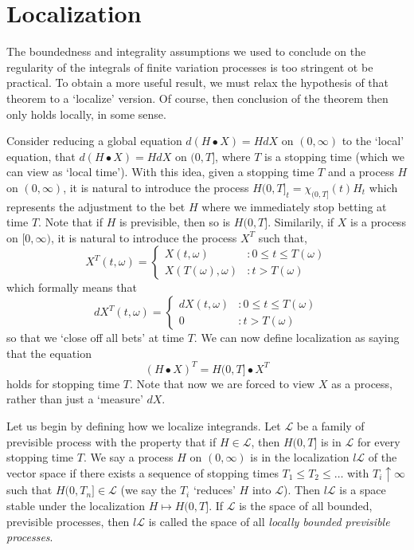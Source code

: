\section{Localization}

The boundedness and integrality assumptions we used to conclude on the regularity of the integrals of finite variation processes is too stringent ot be practical. To obtain a more useful result, we must relax the hypothesis of that theorem to a `localize' version. Of course, then conclusion of the theorem then only holds locally, in some sense.

Consider reducing a global equation $d(H \bullet X) = HdX$ on $(0,\infty)$ to the `local' equation, that $d(H \bullet X) = HdX$ on $(0,T]$, where $T$ is a stopping time (which we can view as `local time'). With this idea, given a stopping time $T$ and a process $H$ on $(0,\infty)$, it is natural to introduce the process $H(0,T]_t = \chi_{(0,T]}(t) H_t$ which represents the adjustment to the bet $H$ where we immediately stop betting at time $T$. Note that if $H$ is previsible, then so is $H(0,T]$. Similarily, if $X$ is a process on $[0,\infty)$, it is natural to introduce the process $X^T$ such that,
%
\[ X^T(t,\omega) = \begin{cases} X(t,\omega) & : 0 \leq t \leq T(\omega) \\ X(T(\omega), \omega) & : t > T(\omega) \end{cases} \]
%
which formally means that
%
\[ dX^T(t,\omega) = \begin{cases} dX(t,\omega) & : 0 \leq t \leq T(\omega) \\ 0 & : t > T(\omega) \end{cases} \]
%
so that we `close off all bets' at time $T$. We can now define localization as saying that the equation
%
\[ (H \bullet X)^T = H(0,T] \bullet X^T \]
%
holds for stopping time $T$. Note that now we are forced to view $X$ as a process, rather than just a `measure' $dX$.

Let us begin by defining how we localize integrands. Let $\mathcal{L}$ be a family of previsible process with the property that if $H \in \mathcal{L}$, then $H(0,T]$ is in $\mathcal{L}$ for every stopping time $T$. We say a process $H$ on $(0,\infty)$ is in the localization $l\mathcal{L}$ of the vector space if there exists a sequence of stopping times $T_1 \leq T_2 \leq \dots$ with $T_i \uparrow \infty$ such that $H(0,T_n] \in \mathcal{L}$ (we say the $T_i$ `reduces' $H$ into $\mathcal{L}$). Then $l\mathcal{L}$ is a space stable under the localization $H \mapsto H(0,T]$. If $\mathcal{L}$ is the space of all bounded, previsible processes, then $l\mathcal{L}$ is called the space of all {\it locally bounded previsible processes}.


